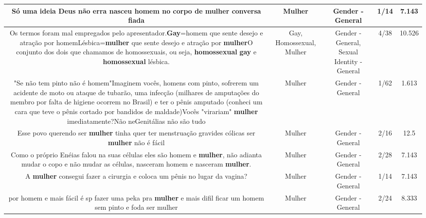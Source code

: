 \documentclass[11pt]{article}
\newlength\mylength
\begin{document}
\begin{center}
\begin{longtable}{|C{.65\mylength}|C{.30\mylength}|C{.12\mylength}|C{.12\mylength}|C{.12\mylength}|}
  \small Só uma ideia Deus não erra nasceu homem no corpo de \textbf{mulher} conversa fiada\normalsize   & Mulher & Gender - General & 1/14 & 7.143 \\  \hline
  \small Os termos foram mal empregados pelo apresentador.\textbf{Gay}=homem que sente desejo e atração por homemLésbica=\textbf{mulher} que sente desejo e atração por \textbf{mulher}O conjunto dos dois que chamamos de homossexuais, ou seja, \textbf{homossexual} \textbf{gay} e \textbf{homossexual} lésbica.\normalsize   & Gay, Homossexual, Mulher & Gender - General, Sexual Identity - General & 4/38 & 10.526 \\  \hline
  \small "Se não tem pinto não é homem"Imaginem vocês, homens com pinto, sofrerem um acidente de moto ou ataque de tubarão, uma infecção (milhares de amputações do membro por falta de higiene ocorrem no Brasil) e ter o pênis amputado (conheci um cara que teve o pênis cortado por bandidos de maldade)Vocês "virariam" \textbf{mulher} imediatamente?Não neGenitálias não são tudo\normalsize   & Mulher & Gender - General & 1/62 & 1.613 \\  \hline
  \small Esse povo querendo ser \textbf{mulher}  tinha quer ter menstruação gravides cólicas   ser \textbf{mulher} não é fácil\normalsize   & Mulher & Gender - General & 2/16 & 12.5 \\  \hline
  \small Como o próprio Enéias falou na suas células eles são homem e \textbf{mulher}, não adianta mudar o copo e não mudar as células, nasceram homem e nasceram \textbf{mulher}.\normalsize   & Mulher & Gender - General & 2/28 & 7.143 \\  \hline
  \small A \textbf{mulher} consegui fazer a cirurgia e coloca um pênis  no lugar da vagina?\normalsize   & Mulher & Gender - General & 1/14 & 7.143 \\  \hline
  \small por homem e mais fácil é sp fazer uma peka pra \textbf{mulher} e mais difil ficar um homem sem pinto e foda ser mulher\normalsize   & Mulher & Gender - General & 2/24 & 8.333 \\  \hline

\end{longtable}
\end{center}
\end{document}
